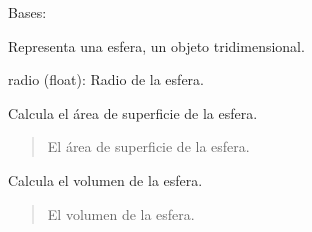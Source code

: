 \documentclass[letterpaper,10pt,spanish]{sphinxmanual}
\begin{document}

\begin{fulllineitems}
\label{\detokenize{pr8:pr8.3.Esfera}}
\pysigstartsignatures
{}
\pysigstopsignatures
\sphinxAtStartPar
Bases: {\hyperref[\detokenize{pr8:pr8.3.Objeto3D}]{}}

\sphinxAtStartPar
Representa una esfera, un objeto tridimensional.
\begin{description}
\sphinxAtStartPar
radio (float): Radio de la esfera.

\end{description}

\begin{fulllineitems}
\label{\detokenize{pr8:pr8.3.Esfera.area_superficie}}
\pysigstartsignatures
{}
\pysigstopsignatures
\sphinxAtStartPar
Calcula el área de superficie de la esfera.
\begin{quote}\begin{description}
\sphinxAtStartPar
El área de superficie de la esfera.

\end{description}\end{quote}

\end{fulllineitems}


\begin{fulllineitems}
\label{\detokenize{pr8:pr8.3.Esfera.volumen}}
\pysigstartsignatures
{}
\pysigstopsignatures
\sphinxAtStartPar
Calcula el volumen de la esfera.
\begin{quote}\begin{description}
\sphinxAtStartPar
El volumen de la esfera.

\end{description}\end{quote}

\end{fulllineitems}


\end{fulllineitems}
\end{document}
